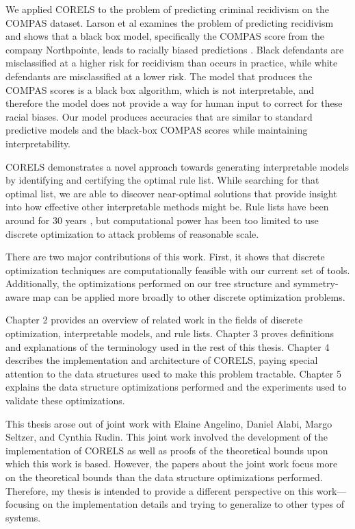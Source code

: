 We applied CORELS to the problem of predicting criminal recidivism on the COMPAS dataset.
Larson et al examines the problem of predicting recidivism and shows that a black box model, specifically the COMPAS score from the company Northpointe, leads to racially biased predictions \cite{LarsonMaKiAn16}.
Black defendants are misclassified at a higher risk for recidivism than occurs in practice, while white defendants are misclassified at a lower risk. 
The model that produces the COMPAS scores is a black box algorithm, which is not interpretable, and therefore the model does not provide a way for human input to correct for these racial biases. 
Our model produces accuracies that are similar to standard predictive models and the black-box COMPAS scores while maintaining interpretability.

CORELS demonstrates a novel approach towards generating interpretable models by identifying and certifying the optimal rule list. 
While searching for that optimal list, we are able to discover near-optimal solutions that provide insight into how effective other interpretable methods might be. 
Rule lists have been around for 30 years \cite{Rivest87}, but computational power has been too limited to use discrete optimization to attack problems of reasonable scale.

There are two major contributions of this work.
First, it shows that discrete optimization techniques are computationally feasible with our current set of tools.
Additionally, the optimizations performed on our tree structure and symmetry-aware map can be applied more broadly to other discrete optimization problems.

Chapter 2 provides an overview of related work in the fields of discrete optimization, interpretable models, and rule lists. 
Chapter 3 proves definitions and explanations of the terminology used in the rest of this thesis.
Chapter 4 describes the implementation and architecture of CORELS, paying special attention to the data structures used to make this problem tractable.
Chapter 5 explains the data structure optimizations performed and the experiments used to validate these optimizations.

\newpage

This thesis arose out of joint work with Elaine Angelino, Daniel Alabi, Margo Seltzer, and Cynthia Rudin.
This joint work involved the development of the implementation of CORELS as well as proofs of the theoretical bounds upon which this work is based.
However, the papers about the joint work focus more on the theoretical bounds than the data structure optimizations performed.
Therefore, my thesis is intended to provide a different perspective on this work---focusing on the implementation details and trying to generalize to other types of systems.